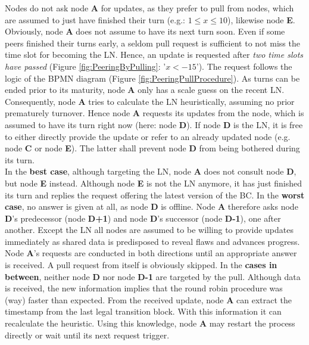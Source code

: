\begin{enumerate}
	Nodes do not ask node \textbf{A} for updates, as they prefer to pull from nodes, which are assumed to just have finished their turn (e.g.: $ 1 \leq x \leq 10$), likewise node \textbf{E}.
	Obviously, node \textbf{A} does not assume to have its next turn soon.
	Even if some peers finished their turns early, a seldom pull request is sufficient to not miss the time slot for becoming the \gls{LN}.
	Hence, an update is requested after \textit{two time slots have passed} (Figure \ref{fig:PeeringByPulling}: '$x < -15$').
	The request follows the logic of the \gls{BPMN} diagram (Figure \ref{fig:PeeringPullProcedure}).
	As turns can be ended prior to its maturity, node \textbf{A} only has a scale guess on the recent \gls{LN}.
	Consequently, node \textbf{A} tries to calculate the \gls{LN} heuristically, assuming no prior prematurely turnover.
	Hence node \textbf{A} requests its updates from the node, which is assumed to have its turn right now (here: node \textbf{D}).
	If node \textbf{D} is the \gls{LN}, it is free to either directly provide the update or refer to an already updated node (e.g. node \textbf{C} or node \textbf{E}).
	The latter shall prevent node \textbf{D} from being bothered during its turn. \\
	In the \textbf{best case}, although targeting the \gls{LN}, node \textbf{A} does not consult node \textbf{D}, but node \textbf{E} instead.
	Although node \textbf{E} is not the \gls{LN} anymore, it has just finished its turn and replies the request offering the latest version of the \gls{BC}.
	In the \textbf{worst case}, no answer is given at all, as node \textbf{D} is offline.
	Node \textbf{A} therefore asks node \textbf{D}'s predecessor (node \textbf{D+1}) and node \textbf{D}'s successor (node \textbf{D-1}), one after another.
	Except the \gls{LN} all nodes are assumed to be willing to provide updates immediately as
	shared data is predisposed to reveal flaws and advances progress.
	Node \textbf{A}'s requests are conducted in both directions until an appropriate answer is received.
	A pull request from itself is obviously skipped.
	In the \textbf{cases in between}, neither node \textbf{D} nor node \textbf{D-1} are targeted by the pull.
	Although data is received, the new information implies that the round robin procedure was (way) faster than expected.
	From the received update, node \textbf{A} can extract the timestamp from the last legal transition block.
	With this information it can recalculate the heuristic.
	Using this knowledge, node \textbf{A} may restart the process directly or wait until its next request trigger.
	

\end{enumerate}
